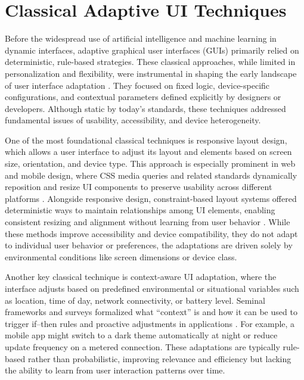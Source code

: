\documentclass[openany]{book}
\begin{document}
\section{Classical Adaptive UI Techniques}
Before the widespread use of artificial intelligence and machine learning in dynamic interfaces, adaptive graphical user interfaces (GUIs) primarily relied on deterministic, rule-based strategies. These classical approaches, while limited in personalization and flexibility, were instrumental in shaping the early landscape of user interface adaptation \cite{Myers2000Tools,Calvary2003Cameleon}. They focused on fixed logic, device-specific configurations, and contextual parameters defined explicitly by designers or developers. Although static by today’s standards, these techniques addressed fundamental issues of usability, accessibility, and device heterogeneity.

One of the most foundational classical techniques is responsive layout design, which allows a user interface to adjust its layout and elements based on screen size, orientation, and device type. This approach is especially prominent in web and mobile design, where CSS media queries and related standards dynamically reposition and resize UI components to preserve usability across different platforms \cite{Marcotte2010RWD,W3C2012MediaQueries}. Alongside responsive design, constraint-based layout systems offered deterministic ways to maintain relationships among UI elements, enabling consistent resizing and alignment without learning from user behavior \cite{Badros2001Cassowary}. While these methods improve accessibility and device compatibility, they do not adapt to individual user behavior or preferences, the adaptations are driven solely by environmental conditions like screen dimensions or device class.

Another key classical technique is context-aware UI adaptation, where the interface adjusts based on predefined environmental or situational variables such as location, time of day, network connectivity, or battery level. Seminal frameworks and surveys formalized what “context” is and how it can be used to trigger if–then rules and proactive adjustments in applications \cite{Dey2001Context,Baldauf2007ContextSurvey}. For example, a mobile app might switch to a dark theme automatically at night or reduce update frequency on a metered connection. These adaptations are typically rule-based rather than probabilistic, improving relevance and efficiency but lacking the ability to learn from user interaction patterns over time.
\end{document}
